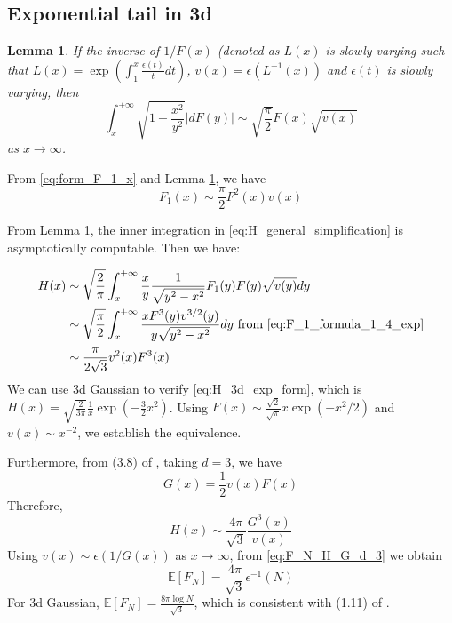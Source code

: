 \documentclass{article}
\newtheorem{lemma}{Lemma}
\def\E{\mathbb{E}}
\begin{document}
\subsection{Exponential tail in 3d}
\begin{lemma}\label{lem:F_x_sqrt_11_exp}
    If the inverse of $1/F(x)$ (denoted as $L(x)$
    is slowly varying such that $L(x)=\exp\left(
        \int_1^x \frac{\epsilon(t)}{t}dt
    \right)$, $v(x)=\epsilon(L^{-1}(x))$ and $\epsilon(t)$ is slowly varying,
    then
    \begin{equation}
        \int_x^{+\infty} \sqrt{1-\frac{x^2}{y^2}}
        |d F(y)| \sim \sqrt{\frac{\pi}{2}} F(x) \sqrt{v(x)}
    \end{equation}
    as $x\to \infty$.
\end{lemma}
From \eqref{eq:form_F_1_x} and Lemma \ref{lem:F_x_sqrt_11_exp}, we have
\begin{equation}\label{eq:F_1_formula_1_4_exp}
    F_1(x) \sim \frac{\pi}{2}
    F^2(x)v(x)
\end{equation}

From Lemma \ref{lem:F_x_sqrt_11_exp},
the inner integration in \eqref{eq:H_general_simplification} is asymptotically
computable. Then we have:

\begin{align}
    H(x)
    &\sim \sqrt{\frac{2}{\pi}}\int_x^{+\infty}
    \frac{x}{ y}\frac{1}{\sqrt{y^2-x^2}}
    F_1(y) F(y)\sqrt{v(y)} dy\\
&\sim \sqrt{\frac{\pi }{2}}\int_x^{+\infty}
\frac{x F^3(y)v^{3/2}(y)}{y\sqrt{y^2-x^2}}dy
\textrm{ from } \eqref{eq:F_1_formula_1_4_exp} \notag\\
&\sim \frac{\pi}{2\sqrt{3}} v^2(x) F^3(x)\label{eq:H_3d_exp_form}
\end{align}
We can use 3d Gaussian to verify
\eqref{eq:H_3d_exp_form}, which is
$H(x) = \sqrt{\frac{2}{3\pi }}\frac{1}{x}\exp(-\frac{3}{2}x^2)$.
Using $F(x) \sim \frac{\sqrt{2}}{\sqrt{\pi}} x\exp(-x^2/2)$
and $v(x)\sim x^{-2}$, we establish the equivalence.

Furthermore, from (3.8) of \cite{dwyer1991convex}, taking $d=3$, we have
\begin{equation}
    G(x) = \frac{1}{2} v(x)F(x)
\end{equation}
Therefore,
\begin{equation}
    H(x) \sim \frac{4\pi}{\sqrt{3}} \frac{G^3(x)}{v(x)}
\end{equation}
Using $v(x) \sim \epsilon(1/G(x))$ as $x\to \infty$,
from \eqref{eq:F_N_H_G_d_3} we obtain
\begin{equation}
    \E[F_N] = \frac{4\pi}{\sqrt{3}} \epsilon^{-1}(N)
\end{equation}
For 3d Gaussian, $\E[F_N]=\frac{8\pi \log N}{\sqrt{3}}$,
which is consistent with (1.11) of \cite{raynaud1970enveloppe}.
\end{document}

